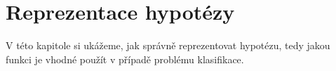 \newpage













\section{Reprezentace hypotézy}
\label{sec:BinarniRegreseReprezentaceHypotezy}

\par{V této kapitole si ukážeme, jak správně reprezentovat hypotézu, tedy jakou funkci je vhodné použít v případě problému klasifikace.}

